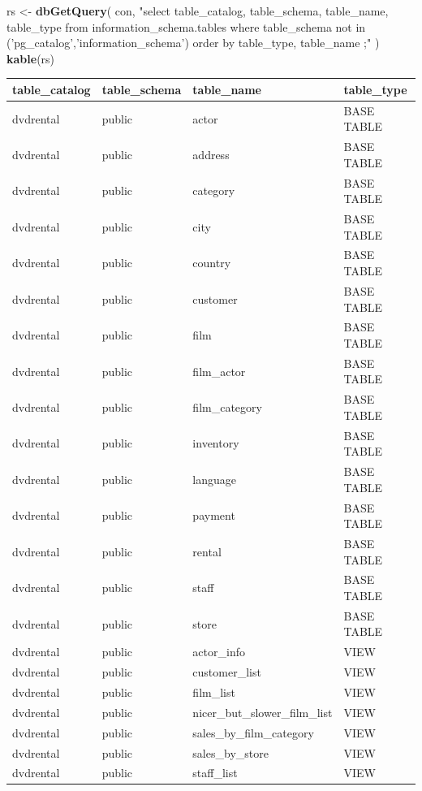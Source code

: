 \documentclass[]{book}
\newenvironment{Shaded}{\begin{snugshade}}{\end{snugshade}}
\newcommand{\KeywordTok}[1]{\textcolor[rgb]{0.13,0.29,0.53}{\textbf{#1}}}
\newcommand{\NormalTok}[1]{#1}
\newcommand{\StringTok}[1]{\textcolor[rgb]{0.31,0.60,0.02}{#1}}
\theoremstyle{definition}
\theoremstyle{definition}
\theoremstyle{definition}
\theoremstyle{remark}
\begin{document}
\begin{Shaded}
\begin{Highlighting}[]
\NormalTok{rs <-}\StringTok{ }\KeywordTok{dbGetQuery}\NormalTok{(}
\NormalTok{  con,}
  \StringTok{"select table_catalog, table_schema, table_name, table_type }
\StringTok{  from information_schema.tables }
\StringTok{  where table_schema not in ('pg_catalog','information_schema')}
\StringTok{  order by table_type, table_name }
\StringTok{  ;"}
\NormalTok{)}
\KeywordTok{kable}\NormalTok{(rs)}
\end{Highlighting}
\end{Shaded}

\begin{tabular}{l|l|l|l}
\hline
table\_catalog & table\_schema & table\_name & table\_type\\
\hline
dvdrental & public & actor & BASE TABLE\\
\hline
dvdrental & public & address & BASE TABLE\\
\hline
dvdrental & public & category & BASE TABLE\\
\hline
dvdrental & public & city & BASE TABLE\\
\hline
dvdrental & public & country & BASE TABLE\\
\hline
dvdrental & public & customer & BASE TABLE\\
\hline
dvdrental & public & film & BASE TABLE\\
\hline
dvdrental & public & film\_actor & BASE TABLE\\
\hline
dvdrental & public & film\_category & BASE TABLE\\
\hline
dvdrental & public & inventory & BASE TABLE\\
\hline
dvdrental & public & language & BASE TABLE\\
\hline
dvdrental & public & payment & BASE TABLE\\
\hline
dvdrental & public & rental & BASE TABLE\\
\hline
dvdrental & public & staff & BASE TABLE\\
\hline
dvdrental & public & store & BASE TABLE\\
\hline
dvdrental & public & actor\_info & VIEW\\
\hline
dvdrental & public & customer\_list & VIEW\\
\hline
dvdrental & public & film\_list & VIEW\\
\hline
dvdrental & public & nicer\_but\_slower\_film\_list & VIEW\\
\hline
dvdrental & public & sales\_by\_film\_category & VIEW\\
\hline
dvdrental & public & sales\_by\_store & VIEW\\
\hline
dvdrental & public & staff\_list & VIEW\\
\hline
\end{tabular}
\end{document}
